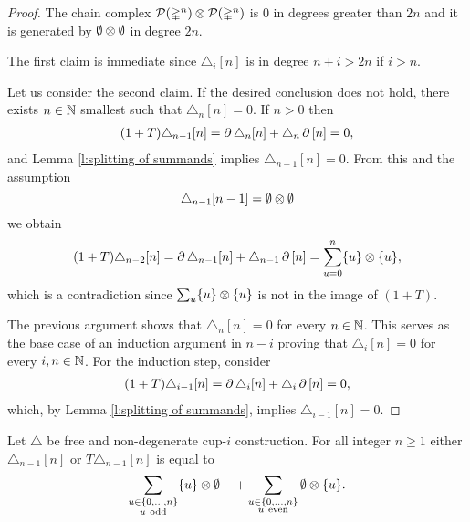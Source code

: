 \begin{proof}
	The chain complex $\mathcal{P}(\mathbb{\Delta}^n) \otimes \mathcal{P}(\mathbb{\Delta}^n)$ is $0$ in degrees greater than $2n$ and it is generated by $\emptyset \otimes \emptyset$ in degree $2n$.

	The first claim is immediate since $\triangle_i[n]$ is in degree $n+i > 2n$ if $i > n$.

	Let us consider the second claim.
	If the desired conclusion does not hold, there exists $n \in \mathbb{N}$ smallest such that $\triangle_n [n] = 0$.
	If $n > 0$ then
	\begin{align*}
	(1+T) \triangle_{n-1} [n] =
	\operatorname{\partial} \triangle_{n} [n] + \triangle_{n} \operatorname{\partial} \, [n] = 0,
	\end{align*}
	and Lemma \ref{l:splitting of summands} implies $\triangle_{n-1} [n] = 0$.
	From this and the assumption
	\[
	\triangle_{n-1}[n-1] = \emptyset \otimes \emptyset
	\]
	we obtain
	\begin{equation}
	\begin{split}
	(1+T)\triangle_{n-2} [n] =
	\operatorname{\partial} \triangle_{n-1} [n] + \triangle_{n-1} \operatorname{\partial} \, [n] =
	\sum_{u = 0}^n \{u\} \otimes \{u\},
	\end{split}
	\end{equation}
	which is a contradiction since $\sum_u \{u\} \otimes \{u\}$ is not in the image of $(1+T)$.

	The previous argument shows that $\triangle_n [n] = 0$ for every $n \in \mathbb{N}$.
	This serves as the base case of an induction argument in $n-i$ proving that $\triangle_i [n] = 0$ for every $i, n \in \mathbb{N}$.
	For the induction step, consider
	\begin{align*}
	(1+T) \triangle_{i-1} [n] =
	\operatorname{\partial} \triangle_{i} [n] + \triangle_{i} \operatorname{\partial}\, [n] = 0,
	\end{align*}
	which, by Lemma \ref{l:splitting of summands}, implies $\triangle_{i-1} [n] = 0$.
\end{proof}

\begin{lemma} \label{l:special case two}
	Let $\triangle$ be free and non-degenerate cup-$i$ construction.
	For all integer $n \geq 1$ either $\triangle_{n-1} [n]$ or $T \triangle_{n-1} [n]$ is equal to
	\[
	\sum_{\substack{u \in \{0,\dots,n\} \\ u \ \mathrm{odd}}} \{u\} \otimes \emptyset
	\quad +
	\sum_{\substack{u \in \{0,\dots,n\} \\ u \ \mathrm{even}}} \emptyset \otimes \{u\}.
	\]
\end{lemma}

